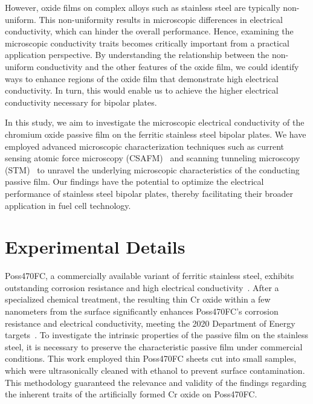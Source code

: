 \documentclass[jkps,reprint,twocolumn,showkeys]{revtex4}
\begin{document}
However, oxide films on complex alloys such as stainless
steel are typically non-uniform.
This non-uniformity results in microscopic differences in electrical conductivity, which can hinder the overall performance. 
Hence, examining the microscopic conductivity traits becomes critically important from a practical application perspective. 
By understanding the relationship between the non-uniform conductivity and the other features of the oxide film, we could identify ways to enhance regions of the oxide film that demonstrate high electrical conductivity. 
In turn, this would enable us to achieve the higher electrical conductivity necessary for bipolar plates.

In this study, we aim to investigate the microscopic electrical conductivity of the chromium oxide passive film on the ferritic stainless steel bipolar plates.  
We have employed advanced microscopic characterization techniques such as current sensing atomic force microscopy (CSAFM)~\cite{afm_review, houze1996ImagingLocalElectrical, Hui2019} and scanning tunneling microscopy (STM)~\cite{stm_review, hansma1987ScanningTunnelingMicroscopy, feenstra1994ScanningTunnelingSpectroscopy} to unravel the underlying microscopic characteristics of the conducting passive film. 
Our findings have the potential to optimize the electrical performance of stainless steel bipolar plates, thereby facilitating their broader application in fuel cell technology.

\section{Experimental Details}
 Poss470FC, a commercially available variant of ferritic stainless steel, exhibits outstanding corrosion resistance and high electrical conductivity~\cite{kim2021posco}.
After a specialized chemical treatment, the resulting thin Cr oxide within a few nanometers from the surface significantly enhances Poss470FC's corrosion resistance and electrical conductivity, meeting the 2020 Department of Energy targets~\cite{doe2020}. 
To investigate the intrinsic properties of the passive film on the stainless steel, it is necessary to preserve the characteristic passive film under commercial conditions.
This work employed thin Poss470FC sheets cut into small samples, which were ultrasonically cleaned with ethanol to prevent surface contamination. 
This methodology guaranteed the relevance and validity of the findings regarding the inherent traits of the artificially formed Cr oxide on Poss470FC.
    
\end{document}
